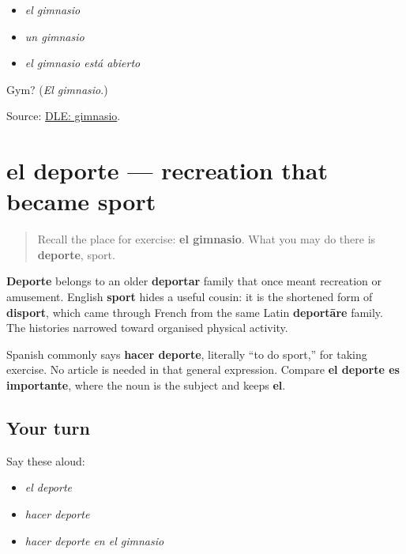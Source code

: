 \begin{itemize}
\raggedright
  \item \emph{el gimnasio}
  \item \emph{un gimnasio}
  \item \emph{el gimnasio está abierto}
\end{itemize}

\begin{tcolorbox}[breakable,colback=teal!4,colframe=teal!35!black,title={Before you move on}]
Gym? (\emph{El gimnasio}.)

Source: \href{https://dle.rae.es/gimnasio}{DLE: gimnasio}.
\end{tcolorbox}
\section[el deporte]{el deporte — recreation that became sport}

\label{lesson:ES-C412-deporte}



\begin{quote}
Recall the place for exercise: \textbf{el gimnasio}. What you may do there is \textbf{deporte}, sport.
\end{quote}

\begin{cousinweb}
\textbf{Deporte} belongs to an older \textbf{deportar} family that once meant recreation or amusement. English \textbf{sport} hides a useful cousin: it is the shortened form of \textbf{disport}, which came through French from the same Latin \textbf{deportāre} family. The histories narrowed toward organised physical activity.
\end{cousinweb}

\begin{grammarlens}[title={Grammar Lens: hacer deporte}]
Spanish commonly says \textbf{hacer deporte}, literally “to do sport,” for taking exercise. No article is needed in that general expression. Compare \textbf{el deporte es importante}, where the noun is the subject and keeps \textbf{el}.
\end{grammarlens}

\subsection*{Your turn}
Say these aloud:

\begin{itemize}
\raggedright
  \item \emph{el deporte}
  \item \emph{hacer deporte}
  \item \emph{hacer deporte en el gimnasio}
\end{itemize}

